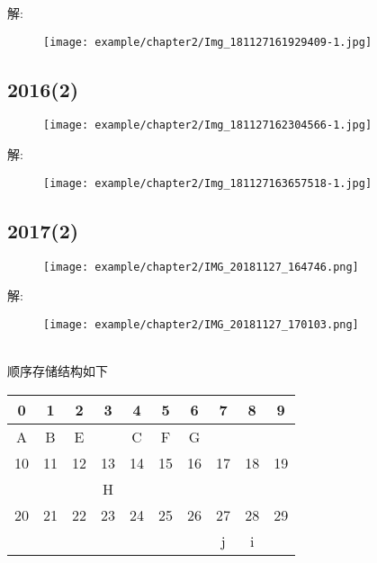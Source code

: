 解:

\begin{figure}[H]
	\centering  %
	\texttt{[image: example/chapter2/Img\_181127161929409-1.jpg]}
\end{figure}


\subsection{2016(2)}

\begin{figure}[H]
	\centering  %
	\texttt{[image: example/chapter2/Img\_181127162304566-1.jpg]}
\end{figure}

解:

\begin{figure}[H]
	\centering  %
	\texttt{[image: example/chapter2/Img\_181127163657518-1.jpg]}
\end{figure}

\subsection{2017(2)}

\begin{figure}[H]
	\centering  %
	\texttt{[image: example/chapter2/IMG\_20181127\_164746.png]}
\end{figure}

解:


\begin{figure}[H]
	\centering  %
	\texttt{[image: example/chapter2/IMG\_20181127\_170103.png]}
\end{figure}
~\\
顺序存储结构如下\newline
\begin{center}
\begin{tabular}{|c|c|c|c|c|c|c|c|c|c|}%
	\hline  %
	0 & 1 & 2 & 3 & 4 & 5 & 6 & 7 & 8 & 9 \\
	\hline  %
	A & B & E &   & C & F & G &   &   &   \\
	\hline  %
	10 & 11 & 12 & 13 & 14 & 15 & 16 & 17 & 18 & 19 \\
	\hline  %
	  &   &   & H &   &   &   &   &   &   \\
	\hline  %
	20 & 21 & 22 & 23 & 24 & 25 & 26 & 27 & 28 & 29 \\
	\hline  %
	  &   &   &   &   &   &   &  j & i  &   \\
	\hline  %
\end{tabular}
\end{center}


